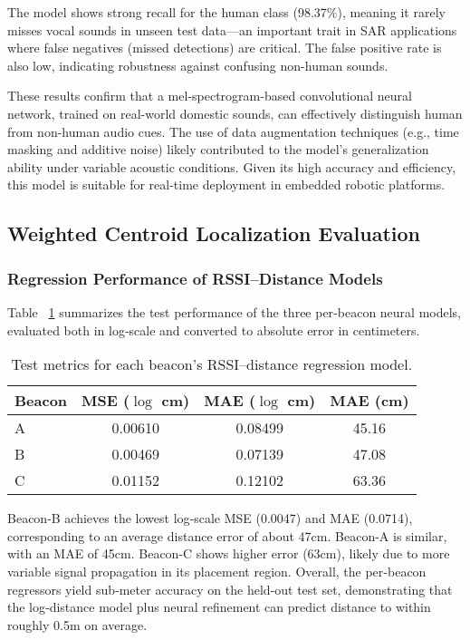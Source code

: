 The model shows strong recall for the human class (98.37\%), meaning it rarely misses vocal sounds in unseen test data—an important trait in SAR applications where false negatives (missed detections) are critical. The false positive rate is also low, indicating robustness against confusing non-human sounds.

These results confirm that a mel-spectrogram-based convolutional neural network, trained on real-world domestic sounds, can effectively distinguish human from non-human audio cues. The use of data augmentation techniques (e.g., time masking and additive noise) likely contributed to the model's generalization ability under variable acoustic conditions. Given its high accuracy and efficiency, this model is suitable for real-time deployment in embedded robotic platforms.

\subsection{Weighted Centroid Localization Evaluation}

\subsubsection{Regression Performance of RSSI–Distance Models}

Table ~\ref{tab:beacon_metrics} summarizes the test performance of the three per‑beacon neural models, evaluated both in log‑scale and converted to absolute error in centimeters.

\begin{table}[ht]
\centering
\caption{Test metrics for each beacon’s RSSI–distance regression model.}
\label{tab:beacon_metrics}
\begin{tabular}{lccc}
\toprule
\textbf{Beacon} & \textbf{MSE (${\log}$ cm)} & \textbf{MAE (${\log}$ cm)} & \textbf{MAE (cm)} \\
\midrule
A & 0.00610 & 0.08499 & 45.16 \\
B & 0.00469 & 0.07139 & 47.08 \\
C & 0.01152 & 0.12102 & 63.36 \\
\bottomrule
\end{tabular}
\end{table}

Beacon-B achieves the lowest log‑scale MSE (0.0047) and MAE (0.0714), corresponding to an average distance error of about 47cm. Beacon-A is similar, with an MAE of 45cm. Beacon-C shows higher error (63cm), likely due to more variable signal propagation in its placement region. Overall, the per‑beacon regressors yield sub‑meter accuracy on the held‑out test set, demonstrating that the log‑distance model plus neural refinement can predict distance to within roughly 0.5m on average.

